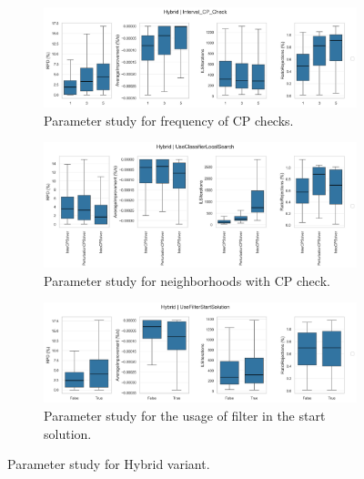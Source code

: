 \begin{figure}[!ht]
	\centering
	\begin{subfigure}[t]{\textwidth}
		\centering
		\includegraphics[width=\linewidth]{pictures/parameter_study/Hybrid_Interval_CP_Check_parameter_study.png}
		\caption{Parameter study for frequency of CP checks.}
	\end{subfigure}
	\begin{subfigure}[t]{\textwidth}
		\centering
		\includegraphics[width=\linewidth]{pictures/parameter_study/Hybrid_UseClassifierLocalSearch_parameter_study.png}
		\caption{Parameter study for neighborhoods with CP check.}
	\end{subfigure}
	\begin{subfigure}[t]{\textwidth}
		\centering
		\includegraphics[width=\linewidth]{pictures/parameter_study/Hybrid_UseFilterStartSolution_parameter_study.png}
		\caption{Parameter study for the usage of filter in the start solution.}
	\end{subfigure}
	\caption{Parameter study for Hybrid variant.}
\end{figure}
\clearpage
